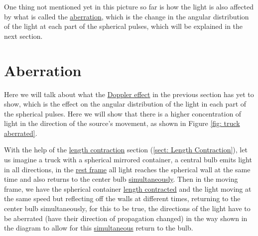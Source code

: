 One thing not mentioned yet in this picture so far is how the light is also affected by what is called the \hyperlink{def-aberration}{aberration}, which is the change in the angular distribution of the light at each part of the spherical pulses, which will be explained in the next section.

\section{Aberration}

Here we will talk about what the \hyperlink{def-doppler-effect}{Doppler effect} in the previous section has yet to show, which is the effect on the angular distribution of the light in each part of the spherical pulses. Here we will show that there is a higher concentration of light in the direction of the source's movement, as shown in Figure \ref{fig: truck aberrated}.

With the help of the \hyperlink{def-length-contraction}{length contraction} section (\ref{sect: Length Contraction}), let us imagine a truck with a spherical mirrored container, a central bulb emits light in all directions, in the \hyperlink{def-proper-frame}{rest frame} all light reaches the spherical wall at the same time and also returns to the center bulb \hyperlink{def-simultaneity}{simultaneously}.
Then in the moving frame, we have the spherical container \hyperlink{def-length-contraction}{length contracted} and the light moving at the same speed but reflecting off the walls at different times, returning to the center bulb simultaneously, for this to be true, the directions of the light have to be aberrated (have their direction of propagation changed) in the way shown in the diagram to allow for this \hyperlink{def-simultaneity}{simultaneous} return to the bulb.

